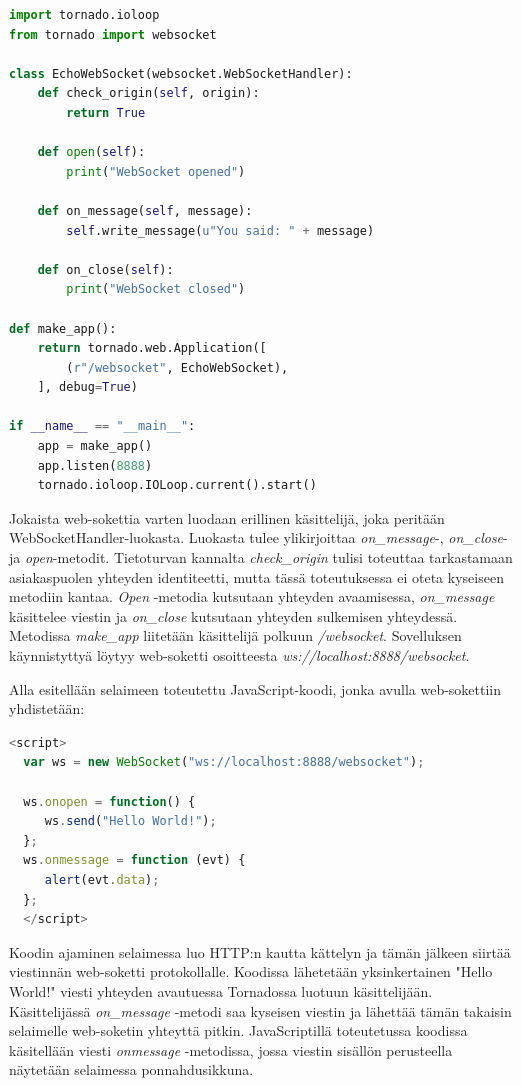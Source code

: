 \documentclass[utf8]{gradu3}
\begin{document}
\lstset{numbers=left}
\begin{lstlisting}[language=Python]
import tornado.ioloop
from tornado import websocket

class EchoWebSocket(websocket.WebSocketHandler):
    def check_origin(self, origin):
        return True

    def open(self):
        print("WebSocket opened")

    def on_message(self, message):
        self.write_message(u"You said: " + message)

    def on_close(self):
        print("WebSocket closed")

def make_app():
    return tornado.web.Application([
        (r"/websocket", EchoWebSocket),
    ], debug=True)

if __name__ == "__main__":
    app = make_app()
    app.listen(8888)
    tornado.ioloop.IOLoop.current().start()
\end{lstlisting}
Jokaista web-sokettia varten luodaan erillinen käsittelijä, joka peritään WebSocketHandler-luokasta. Luokasta tulee ylikirjoittaa \emph{on\_message}-, \emph{on\_close}- ja \emph{open}-metodit. Tietoturvan kannalta \emph{check\_origin} tulisi toteuttaa tarkastamaan asiakaspuolen yhteyden identiteetti, mutta tässä toteutuksessa ei oteta kyseiseen metodiin kantaa. \emph{Open} -metodia kutsutaan yhteyden avaamisessa, \emph{on\_message} käsittelee viestin ja \emph{on\_close} kutsutaan yhteyden sulkemisen yhteydessä. Metodissa \emph{make\_app} liitetään käsittelijä polkuun \emph{/websocket}. Sovelluksen käynnistyttyä löytyy web-soketti osoitteesta \emph{ws://localhost:8888/websocket}.

Alla esitellään selaimeen toteutettu JavaScript-koodi, jonka avulla web-sokettiin yhdistetään:

\begin{lstlisting}[language=JavaScript]
<script>
  var ws = new WebSocket("ws://localhost:8888/websocket");

  ws.onopen = function() {
     ws.send("Hello World!");
  };
  ws.onmessage = function (evt) {
     alert(evt.data);
  };
  </script>
\end{lstlisting}

Koodin ajaminen selaimessa luo HTTP:n kautta kättelyn ja tämän jälkeen siirtää viestinnän web-soketti protokollalle. Koodissa lähetetään yksinkertainen "Hello World!" viesti yhteyden avautuessa Tornadossa luotuun käsittelijään. Käsittelijässä \emph{on\_message} -metodi saa kyseisen viestin ja lähettää tämän takaisin selaimelle web-soketin yhteyttä pitkin. JavaScriptillä toteutetussa koodissa käsitellään viesti \emph{onmessage} -metodissa, jossa viestin sisällön perusteella näytetään selaimessa ponnahdusikkuna. 
\end{document}
